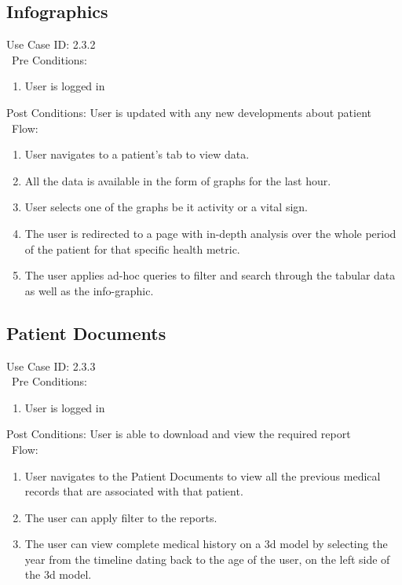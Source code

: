 \subsection{Infographics} 
Use Case ID: 2.3.2\\\
Pre Conditions: 
\begin{enumerate}
    \item User is logged in
\end{enumerate}
Post Conditions: User is updated with any new developments about patient\\\
Flow: 
\begin{enumerate}
    \item User navigates to a patient's tab to view data. 
    \item All the data is available in the form of graphs for the last hour. 
    \item User selects one of the graphs be it activity or a vital sign.
    \item The user is redirected to a page with in-depth analysis over the whole period of the patient for that specific health metric. 
    \item The user applies ad-hoc queries to filter and search through the tabular data as well as the info-graphic.
\end{enumerate}
\subsection{Patient Documents} 
Use Case ID: 2.3.3\\\
Pre Conditions: 
\begin{enumerate}
    \item User is logged in
\end{enumerate}
Post Conditions: User is able to download and view the required report\\\
Flow:
\begin{enumerate}
    \item User navigates to the Patient Documents to view all the previous medical records that are associated with that patient. 
    \item The user can apply filter to the reports. 
    \item The user can view complete medical history on a 3d model by selecting the year from the timeline dating back to the age of the user, on the left side of the 3d model.
\end{enumerate}
